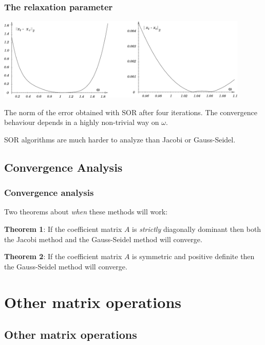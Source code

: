 \documentclass{beamer}
\begin{document}
\begin{frame}
  \frametitle{The relaxation parameter}

  \begin{center}
    \includegraphics[width=0.9\textwidth]{figures/SOR}
  \end{center}
  The norm of the error obtained with SOR after four iterations.  The
  convergence behaviour depends in a highly non-trivial way on
  $\omega$.

  \vspace{1ex}

  SOR algorithms are much harder to analyze than Jacobi or
  Gauss-Seidel.

\end{frame}


\subsection{Convergence Analysis}

\begin{frame}
  \frametitle{Convergence analysis}

  Two theorems about \emph{when} these methods will work:

  \vspace{2ex}

  {\bf Theorem 1}: If the coefficient matrix $A$ is \emph{strictly}
  diagonally dominant then both the Jacobi method and the Gauss-Seidel
  method will converge.

  \vspace{2ex}

  {\bf Theorem 2}: If the coefficient matrix $A$ is symmetric and
  positive definite then the Gauss-Seidel method will converge.

\end{frame}


\section{Other matrix operations}


\subsection{Other matrix operations}
\end{document}
